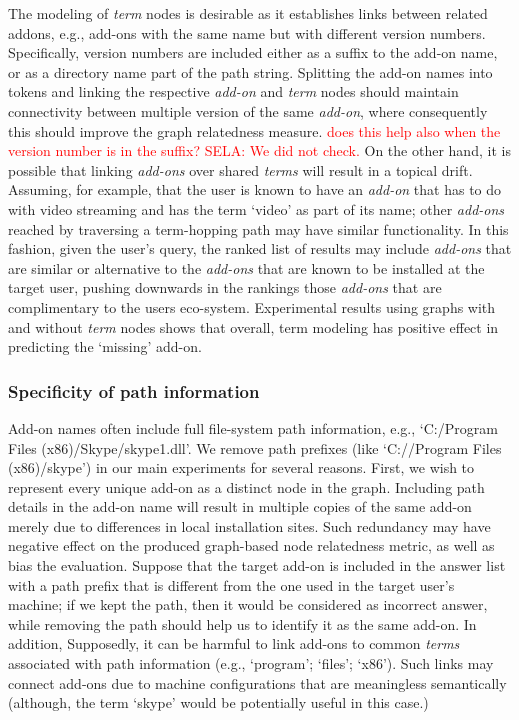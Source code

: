 \documentclass[11pt,oneside]{book}
\let\Oldsubsubsection\subsubsection
\renewcommand{\subsubsection}{\FloatBarrier\Oldsubsubsection}
\begin{document}
The modeling of {\it term} nodes is desirable as it establishes links between related addons, e.g., add-ons with the same name but with different version numbers. Specifically, version numbers are included either as a suffix to the add-on name, or as a directory name part of the path string. Splitting the add-on names into tokens and linking the respective {\it add-on} and {\it term} nodes should maintain connectivity between multiple version of the same {\it add-on}, where consequently this should improve the graph relatedness measure. \textcolor{red}{does this help also when the version number is in the suffix? SELA: We did not check.} On the other hand, it is possible that linking {\it add-ons} over shared {\it terms} will result in a topical drift. Assuming, for example, that the user is known to have an {\it add-on} that has to do with video streaming and has the term `video' as part of its name; other {\it add-ons} reached by traversing a term-hopping path may have similar functionality. In this fashion, given the user's query, the ranked list of results may include {\it add-ons} that are similar or alternative to the {\it add-ons} that are known to be installed at the target user, pushing downwards in the rankings those {\it add-ons} that are complimentary to the users eco-system. Experimental results using graphs with and without {\it term} nodes shows that overall, term modeling has positive effect in predicting the `missing' add-on.

\subsubsection{Specificity of path information} 

Add-on names often include full file-system path information, e.g., `C:/Program Files (x86)/Skype/skype1.dll'. We remove path prefixes (like `C://Program Files (x86)/skype') in our main experiments for several reasons. First, we wish to represent every unique add-on as a distinct node in the graph. Including path details in the add-on name will result in multiple copies of the same add-on merely due to differences in local installation sites. Such redundancy may have negative effect on the produced  graph-based node relatedness metric, as well as bias the evaluation. Suppose that the target add-on is included in the answer list with a path prefix that is different from the one used in the target user's machine; if we kept the path, then it would be considered as incorrect answer, while removing the path should help us to identify it as the same add-on. In addition, Supposedly, it can be harmful to link add-ons to common {\it terms} associated with path information (e.g., `program'; `files'; `x86'). Such links may connect add-ons due to machine configurations that are meaningless semantically (although, the term `skype' would be potentially useful in this case.)
\end{document}
